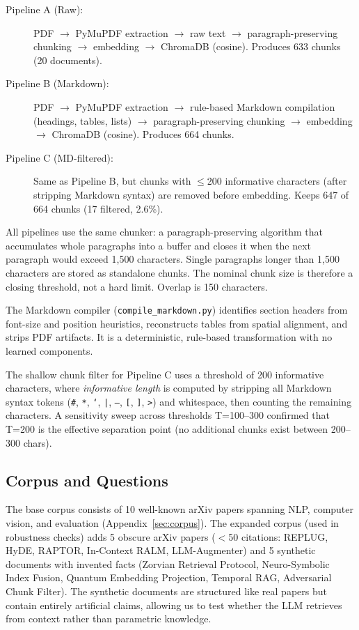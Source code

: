 \documentclass{article}
\begin{document}
\begin{description}
    \item[Pipeline A (Raw):] PDF $\rightarrow$ PyMuPDF extraction $\rightarrow$ raw text $\rightarrow$ paragraph-preserving chunking $\rightarrow$ embedding $\rightarrow$ ChromaDB (cosine). Produces 633 chunks (20 documents).
    \item[Pipeline B (Markdown):] PDF $\rightarrow$ PyMuPDF extraction $\rightarrow$ rule-based Markdown compilation (headings, tables, lists) $\rightarrow$ paragraph-preserving chunking $\rightarrow$ embedding $\rightarrow$ ChromaDB (cosine). Produces 664 chunks.
    \item[Pipeline C (MD-filtered):] Same as Pipeline B, but chunks with $\leq$200 informative characters (after stripping Markdown syntax) are removed before embedding. Keeps 647 of 664 chunks (17 filtered, 2.6\%).
\end{description}

All pipelines use the same chunker: a paragraph-preserving algorithm that accumulates whole paragraphs into a buffer and closes it when the next paragraph would exceed 1,500 characters. Single paragraphs longer than 1,500 characters are stored as standalone chunks. The nominal chunk size is therefore a closing threshold, not a hard limit. Overlap is 150 characters.

The Markdown compiler (\texttt{compile\_markdown.py}) identifies section headers from font-size and position heuristics, reconstructs tables from spatial alignment, and strips PDF artifacts. It is a deterministic, rule-based transformation with no learned components.

The shallow chunk filter for Pipeline C uses a threshold of 200 informative characters, where \emph{informative length} is computed by stripping all Markdown syntax tokens (\texttt{\#}, \texttt{*}, \texttt{`}, \texttt{|}, \texttt{---}, \texttt{[}, \texttt{]}, \texttt{>}) and whitespace, then counting the remaining characters. A sensitivity sweep across thresholds T=100--300 confirmed that T=200 is the effective separation point (no additional chunks exist between 200--300 chars).

\subsection{Corpus and Questions}

The base corpus consists of 10 well-known arXiv papers spanning NLP, computer vision, and evaluation (Appendix~\ref{sec:corpus}). The expanded corpus (used in robustness checks) adds 5 obscure arXiv papers ($<$50 citations: REPLUG, HyDE, RAPTOR, In-Context RALM, LLM-Augmenter) and 5 synthetic documents with invented facts (Zorvian Retrieval Protocol, Neuro-Symbolic Index Fusion, Quantum Embedding Projection, Temporal RAG, Adversarial Chunk Filter). The synthetic documents are structured like real papers but contain entirely artificial claims, allowing us to test whether the LLM retrieves from context rather than parametric knowledge.
\end{document}

